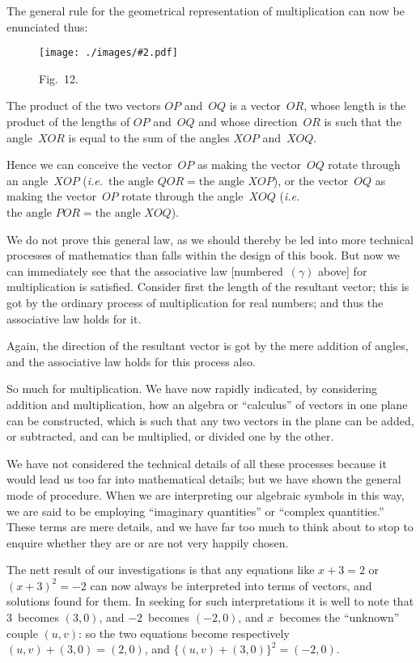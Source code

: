 \documentclass[12pt,leqno]{book}[2005/09/16]
\newcommand{\Graphic}[2]{%
  \phantomsection\label{fig:#2}%
  \texttt{[image: ./images/\#2.pdf]}%
}
\newcommand{\DefWidth}{4in}%
\newcommand{\Figure}[2][\DefWidth]{%
  \begin{figure}[hbt!]
    \centering
    \phantomsection\label{fig:#2}
    \Graphic{#1}{fig#2}
    \caption{Fig.~#2.}
  \end{figure}\ignorespaces%
}
\newcommand{\PageSep}[1]{\ignorespaces}
\newcommand{\ie}{\emph{i.e.}}
\newcommand{\Eq}[1]{\ensuremath{#1}}
\begin{document}
The general rule for the geometrical representation
of multiplication can now be enunciated
thus:
\Figure[3in]{12}

The product of the two vectors $OP$ and~$OQ$
is a vector~$OR$, whose length is the product
of the lengths of $OP$ and~$OQ$ and whose
direction~$OR$ is such that the angle~$XOR$ is
equal to the sum of the angles $XOP$ and~$XOQ$.

Hence we can conceive the vector~$OP$ as
making the vector~$OQ$ rotate through an
angle~$XOP$ (\ie\ $\text{the angle } QOR = \text{the angle } XOP$),
or the vector~$OQ$ as making the vector~$OP$
rotate through the angle~$XOQ$ (\ie $\text{the angle } POR = \text{the angle } XOQ$).

We do not prove this general law, as we
\PageSep{109}
should thereby be led into more technical
processes of mathematics than falls within the
design of this book. But now we can immediately
see that the associative law [numbered~\Eq{(\gamma)}
above] for multiplication is satisfied.
Consider first the length of the resultant
vector; this is got by the ordinary process
of multiplication for real numbers; and thus
the associative law holds for it.

Again, the direction of the resultant vector
is got by the mere addition of angles, and the
associative law holds for this process also.

So much for multiplication. We have now
rapidly indicated, by considering addition and
multiplication, how an algebra or ``calculus''
of vectors in one plane can be constructed,
which is such that any two vectors in the
plane can be added, or subtracted, and can
be multiplied, or divided one by the other.

We have not considered the technical details
of all these processes because it would
lead us too far into mathematical details;
but we have shown the general mode of procedure.
When we are interpreting our algebraic
symbols in this way, we are said to be
employing ``imaginary quantities'' or ``complex
%
%
quantities.'' These terms are mere
details, and we have far too much to think
about to stop to enquire whether they are or
are not very happily chosen.

The nett result of our investigations is that
\PageSep{110}
any equations like $x + 3 = 2$ or $(x + 3)^{2} = -2$
can now always be interpreted into terms of
vectors, and solutions found for them. In
seeking for such interpretations it is well to
note that $3$~becomes $(3, 0)$, and $-2$~becomes
$(-2, 0)$, and $x$~becomes the ``unknown''
couple $(u, v)$: so the two equations become
respectively $(u, v) + (3, 0) = (2, 0)$, and
$\{(u, v) + (3, 0)\}^{2} = (-2, 0)$.
\end{document}
